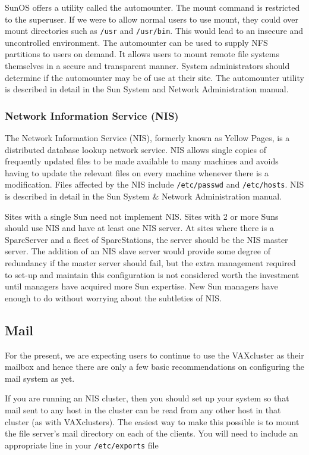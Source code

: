 SunOS offers a utility called the automounter. The mount command is restricted
to the superuser. If we were to allow normal users to use mount, they could
over mount directories such as {\tt /usr} and {\tt /usr/bin}. This would lead to an
insecure and uncontrolled environment. The automounter can be used to supply
NFS partitions to users on demand. It allows users to mount remote file
systems themselves in a secure and transparent manner. System administrators
should determine if the automounter may be of use at their site. The
automounter utility is described in detail in the Sun System and Network
Administration manual.

\subsubsection{Network Information Service (NIS)}

The Network Information Service (NIS), formerly known as Yellow Pages, is a
distributed database lookup network service. NIS allows single copies of
frequently updated files to be made available to many machines and avoids
having to update the relevant files on every machine whenever there is a
modification. Files affected by the NIS include {\tt /etc/passwd} and
{\tt /etc/hosts}.
NIS is described in detail in the Sun System \& Network Administration manual.

Sites with a single Sun need not implement NIS.
Sites with 2 or more Suns should use NIS and have at least one NIS server.
At sites where there is a SparcServer and a fleet of SparcStations, the
server should be the NIS master server. The addition of an NIS slave server
would provide some degree of redundancy if the master server
should fail, but the extra management required to set-up and
maintain this configuration is not considered worth the investment until
managers have acquired more Sun expertise. New Sun
managers have enough to do without worrying about the subtleties of NIS.

\subsection{Mail}

For the present, we are expecting users to continue to use the VAXcluster as
their mailbox and hence there are only a few basic recommendations on
configuring the mail system as yet.

If you are running an NIS cluster, then you should set up your system so that
mail sent to any host in the cluster can be read from any other host in that
cluster (as with VAXclusters). The easiest way to make this possible is to
mount the file server's mail directory on each of the clients. You will
need to include an appropriate line in your {\tt /etc/exports} file

